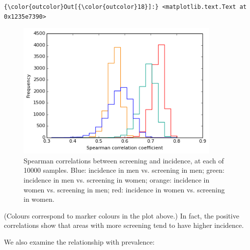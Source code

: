 \documentclass{article}
\begin{document}
    \begin{footnotesize}
            \begin{Verbatim}[commandchars=\\\{\}]
{\color{outcolor}Out[{\color{outcolor}18}]:} <matplotlib.text.Text at 0x1235e7390>
\end{Verbatim}
    \end{footnotesize}
        
    \begin{figure}
        \begin{center}\includegraphics[width=10cm]{local_authorities_files/local_authorities_33_1.png}\end{center}
        \caption{Spearman correlations between screening and incidence, at each of 10000 samples. Blue: incidence in men vs. screening in men; green: incidence in men vs. screening in women; orange: incidence in women vs. screening in men; red: incidence in women vs. screening in women.}
        \label{}
    \end{figure}
    
    (Colours correspond to marker colours in the plot above.) In fact, the
positive correlations show that areas with more screening tend to have
higher incidence.

We also examine the relationship with prevalence:
\end{document}
